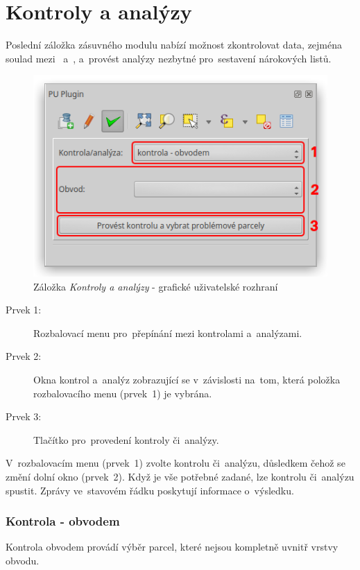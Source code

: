 \newpage

\section{Kontroly a analýzy}
\label{manual_kontroly_analyzy}

Poslední záložka zásuvného modulu nabízí možnost zkontrolovat data, zejména soulad mezi~ a~, a~provést analýzy nezbytné pro~sestavení nárokových listů.

	\begin{figure}[H]
		\centering
		\includegraphics[width=.55\textwidth]{./pictures/ca_gui.png}
		\caption[Záložka \textit{Kontroly a analýzy} - grafické uživatelské rozhraní]{Záložka \textit{Kontroly a analýzy} - grafické uživatelské rozhraní}
		\label{fig:manual_ca_gui}
 	\end{figure}

\begin{description}
	\item[Prvek 1:] Rozbalovací menu pro~přepínání mezi kontrolami a~analýzami.
	\item[Prvek 2:] Okna kontrol a~analýz zobrazující se v~závislosti na~tom, která položka rozbalovacího menu (prvek~1) je vybrána.
	\item[Prvek 3:] Tlačítko pro~provedení kontroly či~analýzy.
\end{description}

V~rozbalovacím menu (prvek~1) zvolte kontrolu či~analýzu, důsledkem čehož se změní dolní okno (prvek~2). Když je vše potřebné zadané, lze kontrolu či~analýzu spustit. Zprávy ve~stavovém řádku poskytují informace o~výsledku.

\subsubsection{Kontrola - obvodem}
\label{manual_kontrola_obvodem}

Kontrola obvodem provádí výběr parcel, které nejsou kompletně uvnitř vrstvy obvodu.

